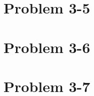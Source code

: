 \documentclass[fontsize=11pt]{scrartcl} %
\numberwithin{equation}{section} %
\numberwithin{figure}{section} %
\numberwithin{table}{section} %
\begin{document}
\section*{Problem 3-5}
\section*{Problem 3-6}
\section*{Problem 3-7}
\end{document}
